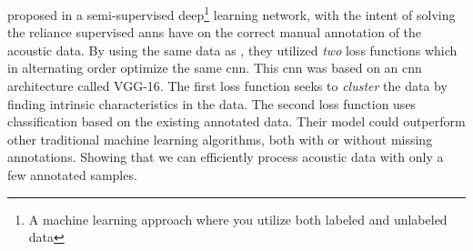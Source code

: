 \citet{semtantic-segm2021choi} proposed in \citeyear{semtantic-segm2021choi} a semi-supervised deep\footnote{A machine learning approach where you utilize both labeled and unlabeled data\cite{Goodfellow-et-al-2016}} learning network, with the intent of solving the reliance supervised \gls{ann}s have on the correct manual annotation of the acoustic data. By using the same data as \citet{brautaset2020acoustic}, they utilized \textit{two} loss functions which in alternating order optimize the same \gls{cnn}. This \gls{cnn} was based on an \gls{cnn} architecture called VGG-16\cite{simonyan2014very}. The first loss function seeks to \textit{cluster} the data by finding intrinsic characteristics in the data. The second loss function uses classification based on the existing annotated data. Their model could outperform other traditional machine learning algorithms, both with or without missing annotations. Showing that we can efficiently process acoustic data with only a few annotated samples.





%        









        
        
        
        
        

        
        
        
        
        
        
 



